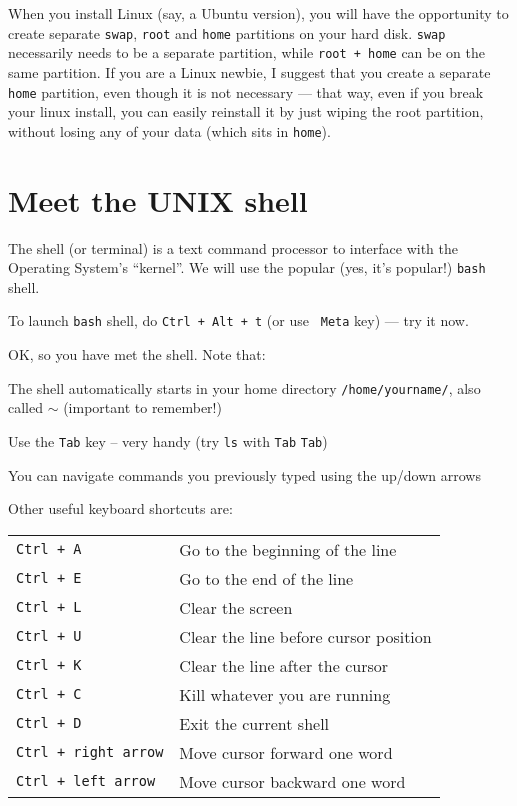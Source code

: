 \begin{tipbox}
When you install Linux (say, a Ubuntu version), you will have the opportunity to create separate {\tt swap}, {\tt root} and {\tt home} partitions on your hard disk. {\tt swap} necessarily needs to be a separate partition, while  {\tt root + home} can be on the same partition. If you are a Linux newbie, I suggest that you create a separate {\tt home} partition, even though it is not necessary --- that way, even if you break your linux install, you can easily reinstall it by just wiping the root partition, without losing any of your data (which sits in {\tt home}).  
\end{tipbox}
  
\section{Meet the UNIX shell}

The shell (or terminal) is a text command processor to interface with 
the Operating System's ``kernel''. We will use the popular (yes, it's 
popular!) {\tt bash} shell. 

\begin{compactitem}[$\quad\star$]\itemsep4pt
	\item To launch {\tt bash} shell, do {\tt Ctrl + Alt + t} (or use {\tt 
Meta} key) --- try it now.
\end{compactitem}

OK, so you have met the shell. Note that:
\begin{compactitem}
   \item The shell automatically starts in your home directory 
  {\tt /home/yourname/}, also called $\sim$ (important to remember!)
   \item Use the {\tt Tab} key -- very handy (try {\tt ls} with {\tt Tab} 
{\tt Tab})
   \item You can navigate commands you previously typed using the up/down arrows  
\end{compactitem}

Other useful keyboard shortcuts are:

\begin{tabular}{p{4.4cm} p{9cm}} 
  {\tt Ctrl + A} & Go to the beginning of the line\\
  {\tt Ctrl + E} & Go to the end of the line\\
  {\tt Ctrl + L} & Clear the screen\\
  {\tt Ctrl + U} & Clear the line before cursor position\\
  {\tt Ctrl + K} & Clear the line after the cursor\\
  {\tt Ctrl + C} & Kill whatever you are running\\
  {\tt Ctrl + D} & Exit the current shell\\
  {\tt Ctrl + right arrow} & Move cursor forward one word\\
  {\tt Ctrl + left arrow} & Move cursor backward one word\\
  \end{tabular}


